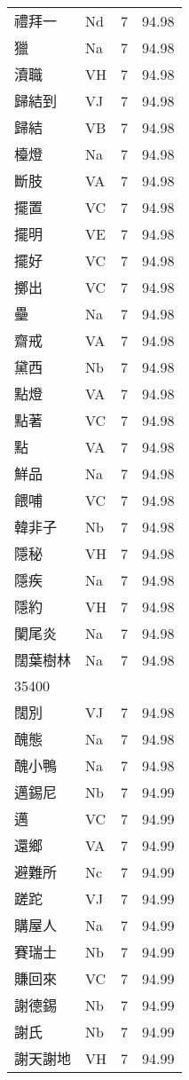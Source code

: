 \documentclass[twocolumn]{book}
\begin{document}
\begin{supertabular}{llrr}
禮拜一 & Nd & 7 &  94.98\\
獵 & Na & 7 &  94.98\\
瀆職 & VH & 7 &  94.98\\
歸結到 & VJ & 7 &  94.98\\
歸結 & VB & 7 &  94.98\\
檯燈 & Na & 7 &  94.98\\
斷肢 & VA & 7 &  94.98\\
擺置 & VC & 7 &  94.98\\
擺明 & VE & 7 &  94.98\\
擺好 & VC & 7 &  94.98\\
擲出 & VC & 7 &  94.98\\
壘 & Na & 7 &  94.98\\
齋戒 & VA & 7 &  94.98\\
黛西 & Nb & 7 &  94.98\\
點燈 & VA & 7 &  94.98\\
點著 & VC & 7 &  94.98\\
點 & VA & 7 &  94.98\\
鮮品 & Na & 7 &  94.98\\
餵哺 & VC & 7 &  94.98\\
韓非子 & Nb & 7 &  94.98\\
隱秘 & VH & 7 &  94.98\\
隱疾 & Na & 7 &  94.98\\
隱約 & VH & 7 &  94.98\\
闌尾炎 & Na & 7 &  94.98\\
闊葉樹林 & Na & 7 &  94.98\\
35400\\
闊別 & VJ & 7 &  94.98\\
醜態 & Na & 7 &  94.98\\
醜小鴨 & Na & 7 &  94.98\\
邁錫尼 & Nb & 7 &  94.99\\
邁 & VC & 7 &  94.99\\
還鄉 & VA & 7 &  94.99\\
避難所 & Nc & 7 &  94.99\\
蹉跎 & VJ & 7 &  94.99\\
購屋人 & Na & 7 &  94.99\\
賽瑞士 & Nb & 7 &  94.99\\
賺回來 & VC & 7 &  94.99\\
謝德錫 & Nb & 7 &  94.99\\
謝氏 & Nb & 7 &  94.99\\
謝天謝地 & VH & 7 &  94.99\\

\end{supertabular}
\end{document}
